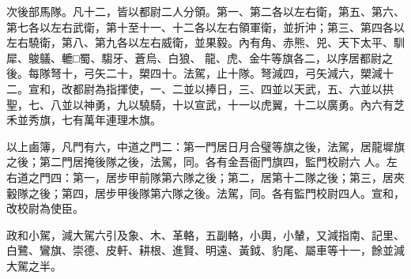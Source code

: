 \begin{pinyinscope}
 次後部馬隊。凡十二，皆以都尉二人分領。第一、第二各以左右衛，第五、第六、第七各以左右武衛，第十至十一、十二各以左右領軍衛，並折沖；第三、第四各以左右驍衛，第八、第九各以左右威衛，並果毅。內有角、赤熊、兕、天下太平、馴犀、鵔鸃、轆□蜀、騶牙、蒼烏、白狼、
 龍、虎、金牛等旗各二，以序居都尉之後。每隊弩十，弓矢二十，槊四十。法駕，止十隊。弩減四，弓矢減六，槊減十二。宣和，改都尉為指揮使，一、二並以捧日，三、四並以天武，五、六並以拱聖，七、八並以神勇，九以驍騎，十以宣武，十一以虎翼，十二以廣勇。內六有芝禾並秀旗，七有萬年連理木旗。



 以上鹵簿，凡門有六，中道之門二：第一門居日月合璧等旗之後，法駕，居龍墀旗之後；第二門居掩後隊之後，法駕，同。各有金吾衙門旗四，監門校尉六
 人。左右道之門四：第一，居步甲前隊第六隊之後；第二，居第十二隊之後；第三，居夾轂隊之後；第四，居步甲後隊第六隊之後。法駕，同。各有監門校尉四人。宣和，改校尉為使臣。



 政和小駕，減大駕六引及象、木、革輅，五副輅，小輿，小輦，又減指南、記里、白鷺、鸞旗、崇德、皮軒、耕根、進賢、明遠、黃鉞、豹尾、屬車等十一，餘並減大駕之半。



\end{pinyinscope}